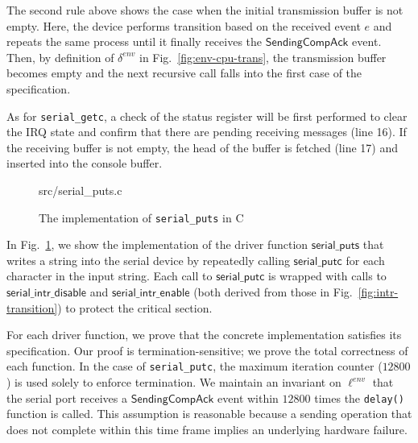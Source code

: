 The second rule above shows the case when the initial transmission buffer
is not empty. Here, the device performs transition based on
the received event $e$ and repeats the same process until it finally
receives the $\textsf{SendingCompAck}$ event. Then, by definition of
$\delta^{env}$ in Fig.~\ref{fig:env-cpu-trans}, the transmission
buffer becomes empty and the next recursive call falls into the first
case of the specification.

As for \texttt{serial\_getc}, a check of the status register will be first performed
to clear the \textsf{IRQ} state and confirm that there are pending receiving
messages (line 16). If the receiving buffer is not empty, the head of the buffer is
fetched (line 17) and inserted into the console buffer.

\begin{figure}
	 {src/serial_puts.c}
	\caption{The implementation of \texttt{serial\_puts} in C}
	\label{fig:serial_puts}
	\vspace{-10pt}
\end{figure}

In Fig.~\ref{fig:serial_puts}, we show the implementation of the
driver function $\textsf{serial\_puts}$ that writes a string into the
serial device by repeatedly calling $\textsf{serial\_putc}$ for each
character in the input string. Each call to $\textsf{serial\_putc}$ is
wrapped with calls to $\textsf{serial\_intr\_disable}$ and
$\textsf{serial\_intr\_enable}$ (both derived from those
in Fig.~\ref{fig:intr-transition}) to protect the critical section.

For each driver function, we prove
that the concrete implementation satisfies its specification. Our
proof is termination-sensitive; we prove the total correctness of each
function. In the case of \texttt{serial\_putc}, the maximum iteration
counter ($12800$) is used solely to enforce termination. We maintain
an invariant on $\ell^{env}$ that the serial port receives a
$\textsf{SendingCompAck}$ event within $12800$ times the
\texttt{delay()} function is called. This assumption is reasonable
because a sending operation that does not complete within this
time frame implies an underlying hardware failure.


%
%


